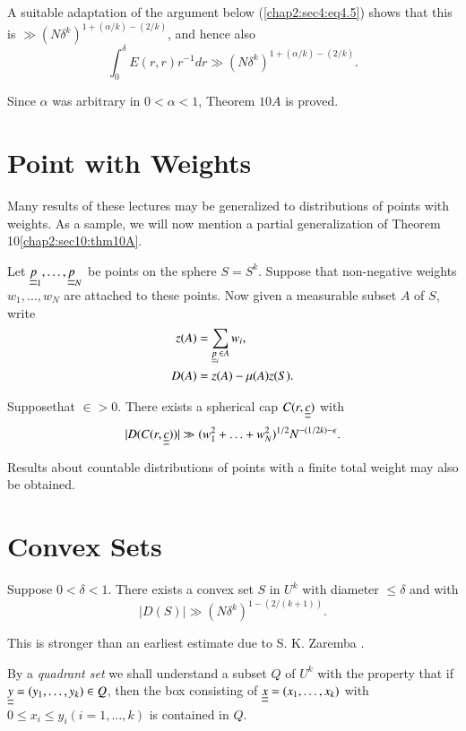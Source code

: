 A suitable adaptation of the argument below (\ref{chap2:sec4:eq4.5}) shows that this is $\gg (N \delta^{k})^{1 + (\alpha/k)-(2/k)}$, and hence also
$$
\int_{0}^{\delta} E(r, r) r^{-1} dr \gg (N \delta^{k})^{1+(\alpha/k)-(2/k)}.
$$

Since $\alpha$ was arbitrary in $0 < \alpha < 1$, Theorem $10A$ is proved.

\section{Point with Weights}\label{chap2:sec12} 

Many results of these lectures may be generalized to distributions of points with weights. As a sample, we will now mention a partial generalization of Theorem 10\ref{chap2:sec10:thm10A}.

Let $\underline{\underline{p}}_{1}, \ldots, \underline{\underline{p}}_{N}$ be points on the sphere $S = S^{k}$. Suppose that non-negative weights $w_{1}, \ldots, w_{N}$ are attached to these points. Now given a measurable subset $A$ of $S$, write
\begin{align*}
z(A) & = \sum_{\underline{\underline{p}}_{i} \in A} w_{i},\\
D(A) & = z(A) -\mu(A) z(S).
\end{align*}

\begin{theorem}\label{chap2:sec12:thm12A}
Suppose\pageoriginale that $\in > 0$. There exists a spherical cap $C(r, \underline{\underline{c}})$ with
$$
|D(C(r, \underline{\underline{c}}))| \gg (w_{1}^{2} + \ldots + w_{N}^{2})^{1/2} N^{-(1/2k)- \epsilon} .
$$
\end{theorem}

Results about countable distributions of points with a finite total weight may also be obtained.

\section{Convex Sets}\label{chap2:sec13}

\begin{theorem}\label{chap2:sec13:thm13A} 
Suppose $0 < \delta < 1$. There exists a convex set $S$ in $U^{k}$ with diameter $\leq \delta$ and with 
$$
|D(S)| \gg (N \delta^{k})^{1-(2/(k+1))}.
$$
\end{theorem}

This is stronger than an earliest estimate due to S. K. Zaremba \cite{30}.

By a {\em quadrant set} we shall understand a subset $Q$ of $U^{k}$ with the property that if $\underline{\underline{y}} = (y_{1}, \ldots, y_{k}) \in Q$, then the box consisting of $\underline{\underline{x}} = (x_{1}, \ldots, x_{k})$ with $0 \leq x_{i} \leq y_{i} (i = 1, \ldots, k)$ is contained in $Q$.

